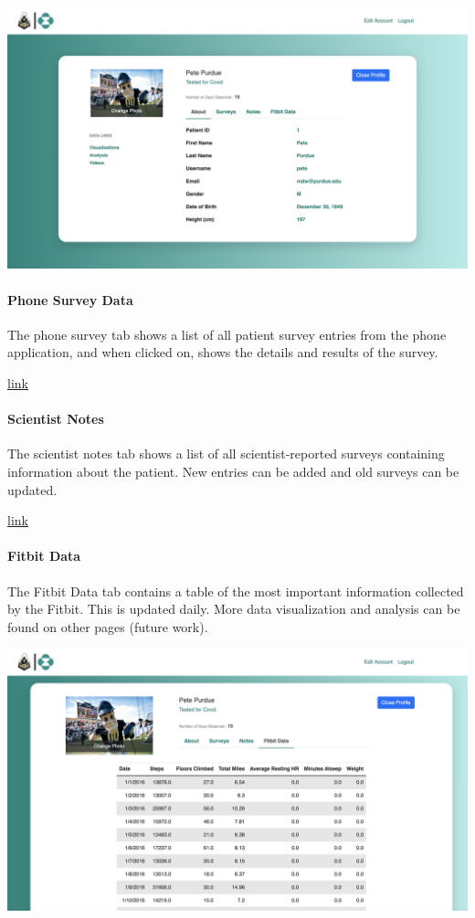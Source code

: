 \documentclass[]{book}
\let\oldparagraph\paragraph
\renewcommand{\paragraph}[1]{\oldparagraph{#1}\mbox{}}
\begin{document}
\includegraphics{images/Information_page.png}

\hypertarget{phone-survey-data}{%
\paragraph{Phone Survey Data}\label{phone-survey-data}}

The phone survey tab shows a list of all patient survey entries from the phone application, and when clicked on, shows the details and results of the survey.

\href{images/phone_survey_gif.gif}{link}

\hypertarget{scientist-notes}{%
\paragraph{Scientist Notes}\label{scientist-notes}}

The scientist notes tab shows a list of all scientist-reported surveys containing information about the patient. New entries can be added and old surveys can be updated.

\href{images/scientist_note_gif.gif}{link}

\hypertarget{fitbit-data}{%
\paragraph{Fitbit Data}\label{fitbit-data}}

The Fitbit Data tab contains a table of the most important information collected by the Fitbit. This is updated daily. More data visualization and analysis can be found on other pages (future work).

\includegraphics{images/Fitbit_page.png}
\end{document}
